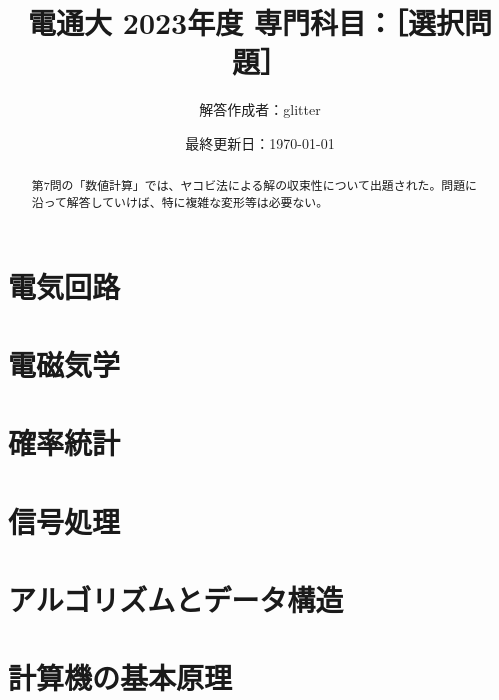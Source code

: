 \documentclass{jsarticle}
\theoremstyle{definition}
\begin{document}
\title{電通大 2023年度 専門科目：［選択問題］}
\author{解答作成者：glitter}
\date{最終更新日：\today}
\maketitle
  \begin{abstract}
    第7問の「数値計算」では、ヤコビ法による解の収束性について出題された。問題に沿って解答していけば、特に複雑な変形等は必要ない。
  \end{abstract}
  \section{電気回路}

  \section{電磁気学}

  \section{確率統計}

  \section{信号処理}

  \section{アルゴリズムとデータ構造}

  \section{計算機の基本原理}

  \newpage
\end{document}
